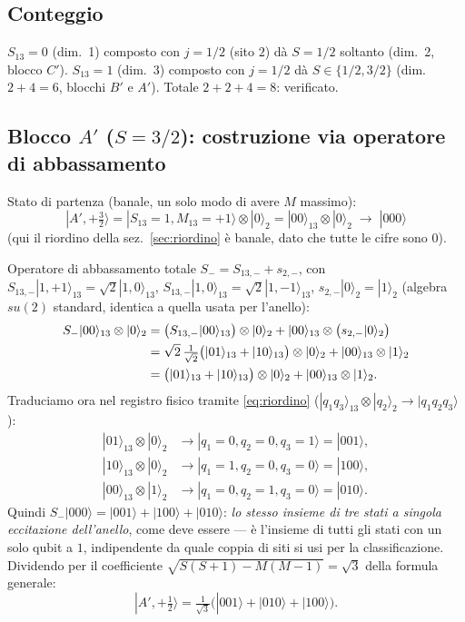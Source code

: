 \documentclass[11pt,a4paper]{article}
\begin{document}
\subsection{Conteggio}

$S_{13}=0$ (dim.\ 1) composto con $j=1/2$ (sito $2$) dà $S=1/2$ soltanto
(dim.\ 2, blocco $C'$). $S_{13}=1$ (dim.\ 3) composto con $j=1/2$ dà $S\in\{1/2,3/2\}$
(dim.\ $2+4=6$, blocchi $B'$ e $A'$). Totale $2+2+4=8$: verificato.

\subsection{Blocco $A'$ ($S=3/2$): costruzione via operatore di abbassamento}

Stato di partenza (banale, un solo modo di avere $M$ massimo):
\begin{equation}
|A',{+}\tfrac32\rangle = |S_{13}{=}1,M_{13}{=}{+}1\rangle\otimes|0\rangle_2 = |00\rangle_{13}\otimes|0\rangle_2 \;\longrightarrow\; |000\rangle
\end{equation}
(qui il riordino della sez.~\ref{sec:riordino} è banale, dato che tutte le
cifre sono $0$).

Operatore di abbassamento totale $S_-=S_{13,-}+s_{2,-}$, con
$S_{13,-}|1,{+}1\rangle_{13}=\sqrt2|1,0\rangle_{13}$,
$S_{13,-}|1,0\rangle_{13}=\sqrt2|1,{-}1\rangle_{13}$, $s_{2,-}|0\rangle_2=|1\rangle_2$
(algebra $su(2)$ standard, identica a quella usata per l'anello):
\begin{align}
S_-|00\rangle_{13}\otimes|0\rangle_2
&= \big(S_{13,-}|00\rangle_{13}\big)\otimes|0\rangle_2 + |00\rangle_{13}\otimes\big(s_{2,-}|0\rangle_2\big)\notag\\
&= \sqrt2\,\tfrac1{\sqrt2}\big(|01\rangle_{13}+|10\rangle_{13}\big)\otimes|0\rangle_2 + |00\rangle_{13}\otimes|1\rangle_2\notag\\
&= \big(|01\rangle_{13}+|10\rangle_{13}\big)\otimes|0\rangle_2 + |00\rangle_{13}\otimes|1\rangle_2 .
\end{align}
Traduciamo ora nel registro fisico tramite \eqref{eq:riordino} ($|q_1q_3\rangle_{13}\otimes|q_2\rangle_2\to|q_1q_2q_3\rangle$):
\begin{align}
|01\rangle_{13}\otimes|0\rangle_2 &\to |q_1{=}0,q_2{=}0,q_3{=}1\rangle = |001\rangle,\\
|10\rangle_{13}\otimes|0\rangle_2 &\to |q_1{=}1,q_2{=}0,q_3{=}0\rangle = |100\rangle,\\
|00\rangle_{13}\otimes|1\rangle_2 &\to |q_1{=}0,q_2{=}1,q_3{=}0\rangle = |010\rangle.
\end{align}
Quindi $S_-|000\rangle = |001\rangle+|100\rangle+|010\rangle$: \emph{lo stesso
insieme di tre stati a singola eccitazione dell'anello}, come deve essere —
è l'insieme di tutti gli stati con un solo qubit a $1$, indipendente da
quale coppia di siti si usi per la classificazione. Dividendo per il
coefficiente $\sqrt{S(S{+}1)-M(M{-}1)}=\sqrt3$ della formula generale:
\begin{equation}
|A',{+}\tfrac12\rangle = \tfrac1{\sqrt3}\big(|001\rangle+|010\rangle+|100\rangle\big).
\label{eq:Ap12}
\end{equation}
\end{document}
